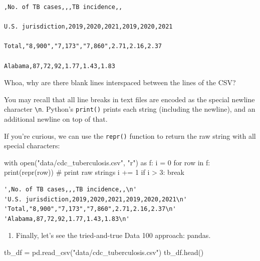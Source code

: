 \documentclass[
  letterpaper,
  DIV=11,
  numbers=noendperiod]{scrreprt}
\newenvironment{Shaded}{\begin{snugshade}}{\end{snugshade}}
\newcommand{\BuiltInTok}[1]{\textcolor[rgb]{0.00,0.23,0.31}{#1}}
\newcommand{\CommentTok}[1]{\textcolor[rgb]{0.37,0.37,0.37}{#1}}
\newcommand{\ControlFlowTok}[1]{\textcolor[rgb]{0.00,0.23,0.31}{#1}}
\newcommand{\DecValTok}[1]{\textcolor[rgb]{0.68,0.00,0.00}{#1}}
\newcommand{\ImportTok}[1]{\textcolor[rgb]{0.00,0.46,0.62}{#1}}
\newcommand{\KeywordTok}[1]{\textcolor[rgb]{0.00,0.23,0.31}{#1}}
\newcommand{\NormalTok}[1]{\textcolor[rgb]{0.00,0.23,0.31}{#1}}
\newcommand{\OperatorTok}[1]{\textcolor[rgb]{0.37,0.37,0.37}{#1}}
\newcommand{\StringTok}[1]{\textcolor[rgb]{0.13,0.47,0.30}{#1}}
\providecommand{\tightlist}{%
  \setlength{\itemsep}{0pt}\setlength{\parskip}{0pt}}\usepackage{longtable,booktabs,array}
\begin{document}
\begin{verbatim}
,No. of TB cases,,,TB incidence,,

U.S. jurisdiction,2019,2020,2021,2019,2020,2021

Total,"8,900","7,173","7,860",2.71,2.16,2.37

Alabama,87,72,92,1.77,1.43,1.83
\end{verbatim}

Whoa, why are there blank lines interspaced between the lines of the
CSV?

You may recall that all line breaks in text files are encoded as the
special newline character \texttt{\textbackslash{}n}. Python's
\texttt{print()} prints each string (including the newline), and an
additional newline on top of that.

If you're curious, we can use the \texttt{repr()} function to return the
raw string with all special characters:

\begin{Shaded}
\begin{Highlighting}[]
\ControlFlowTok{with} \BuiltInTok{open}\NormalTok{(}\StringTok{"data/cdc\_tuberculosis.csv"}\NormalTok{, }\StringTok{"r"}\NormalTok{) }\ImportTok{as}\NormalTok{ f:}
\NormalTok{    i }\OperatorTok{=} \DecValTok{0}
    \ControlFlowTok{for}\NormalTok{ row }\KeywordTok{in}\NormalTok{ f:}
        \BuiltInTok{print}\NormalTok{(}\BuiltInTok{repr}\NormalTok{(row)) }\CommentTok{\# print raw strings}
\NormalTok{        i }\OperatorTok{+=} \DecValTok{1}
        \ControlFlowTok{if}\NormalTok{ i }\OperatorTok{\textgreater{}} \DecValTok{3}\NormalTok{:}
            \ControlFlowTok{break}
\end{Highlighting}
\end{Shaded}

\begin{verbatim}
',No. of TB cases,,,TB incidence,,\n'
'U.S. jurisdiction,2019,2020,2021,2019,2020,2021\n'
'Total,"8,900","7,173","7,860",2.71,2.16,2.37\n'
'Alabama,87,72,92,1.77,1.43,1.83\n'
\end{verbatim}

\begin{enumerate}
\def\labelenumi{\arabic{enumi}.}
\setcounter{enumi}{3}
\tightlist
\item
  Finally, let's see the tried-and-true Data 100 approach: pandas.
\end{enumerate}

\begin{Shaded}
\begin{Highlighting}[]
\NormalTok{tb\_df }\OperatorTok{=}\NormalTok{ pd.read\_csv(}\StringTok{"data/cdc\_tuberculosis.csv"}\NormalTok{)}
\NormalTok{tb\_df.head()}
\end{Highlighting}
\end{Shaded}
\end{document}
